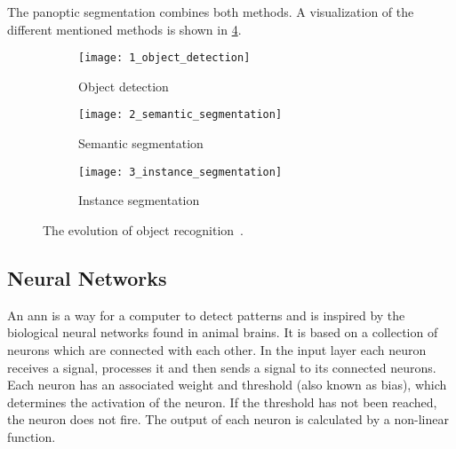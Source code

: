 The panoptic segmentation combines both methods.
A visualization of the different mentioned methods is shown in \cref{fig:object_recognition}.
\begin{figure}[htb]
    \centering
    \begin{subfigure}{0.32\textwidth}
        \centering
        \texttt{[image: 1\_object\_detection]}
        \caption{Object detection}
        \label{fig:object_detection}
    \end{subfigure}
    \begin{subfigure}{0.32\textwidth}
        \centering
        \texttt{[image: 2\_semantic\_segmentation]}
        \caption{Semantic segmentation}
        \label{fig:semantic_segmentation}
    \end{subfigure}
    \begin{subfigure}{0.32\textwidth}
        \centering
        \texttt{[image: 3\_instance\_segmentation]}
        \caption{Instance segmentation}
        \label{fig:instance_segmentation}
    \end{subfigure}
    \caption[Evolution of object recognition]{The evolution of object recognition~\cite{Garcia2017}.}
    \label{fig:object_recognition}
\end{figure}


\subsection{Neural Networks}
An \gls{ann} is a way for a computer to detect patterns and is inspired by the biological neural networks found in animal brains.
It is based on a collection of neurons which are connected with each other.
In the input layer each neuron receives a signal, processes it and then sends a signal to its connected neurons.
Each neuron has an associated weight and threshold (also known as bias), which determines the activation of the neuron.
If the threshold has not been reached, the neuron does not fire.
The output of each neuron is calculated by a non-linear function.

